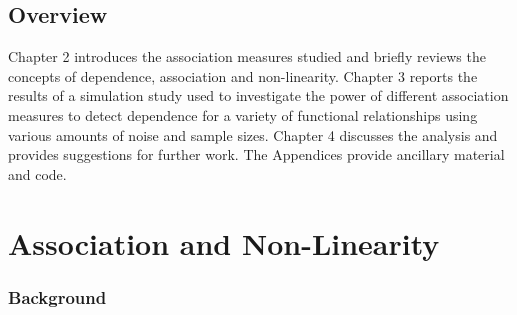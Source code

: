 \documentclass[a4paper, 12pt]{report}
\begin{document}
\section{Overview}
Chapter 2 introduces the association measures studied and briefly reviews the concepts of dependence, association and non-linearity. Chapter 3 reports the results of a simulation study used to investigate the power of different association measures to detect dependence for a variety of functional relationships using various amounts of noise and sample sizes. Chapter 4 discusses the analysis and provides suggestions for further work. The Appendices provide ancillary material and code.



\chapter{Association and Non-Linearity}

\subsection*{Background}
%
%
%
%
%
%
%
%
%
%
%
\end{document}
